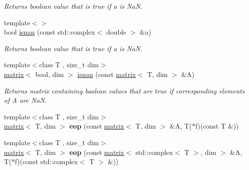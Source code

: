 \begin{DoxyCompactItemize}
\begin{DoxyCompactList}\small\item\em Returns boolean value that is true if a is Na\-N. \end{DoxyCompactList}\item 
\hypertarget{namespacekeycpp_ad06706aa6f44dde4b12566f81ed2be94}{{\footnotesize template$<$$>$ }\\bool \hyperlink{namespacekeycpp_ad06706aa6f44dde4b12566f81ed2be94}{isnan} (const std\-::complex$<$ double $>$ \&a)}\label{namespacekeycpp_ad06706aa6f44dde4b12566f81ed2be94}

\begin{DoxyCompactList}\small\item\em Returns boolean value that is true if a is Na\-N. \end{DoxyCompactList}\item 
\hypertarget{namespacekeycpp_a7e322f9a9b9a2bd3446ecaffbcea88cb}{{\footnotesize template$<$class T , size\-\_\-t dim$>$ }\\\hyperlink{classkeycpp_1_1matrix}{matrix}$<$ bool, dim $>$ \hyperlink{namespacekeycpp_a7e322f9a9b9a2bd3446ecaffbcea88cb}{isnan} (const \hyperlink{classkeycpp_1_1matrix}{matrix}$<$ T, dim $>$ \&A)}\label{namespacekeycpp_a7e322f9a9b9a2bd3446ecaffbcea88cb}

\begin{DoxyCompactList}\small\item\em Returns matrix containing boolean values that are true if corresponding elements of A are Na\-N. \end{DoxyCompactList}\item 
\hypertarget{namespacekeycpp_ac999bd518fb456aa9a4fbd2c04f007de}{{\footnotesize template$<$class T , size\-\_\-t dim$>$ }\\\hyperlink{classkeycpp_1_1matrix}{matrix}$<$ T, dim $>$ {\bfseries eop} (const \hyperlink{classkeycpp_1_1matrix}{matrix}$<$ T, dim $>$ \&A, T($\ast$f)(const T \&))}\label{namespacekeycpp_ac999bd518fb456aa9a4fbd2c04f007de}

\item 
\hypertarget{namespacekeycpp_a0865e2c884915d6ed0e3ef7bf73438b0}{{\footnotesize template$<$class T , size\-\_\-t dim$>$ }\\\hyperlink{classkeycpp_1_1matrix}{matrix}$<$ T, dim $>$ {\bfseries eop} (const \hyperlink{classkeycpp_1_1matrix}{matrix}$<$ std\-::complex$<$ T $>$, dim $>$ \&A, T($\ast$f)(const std\-::complex$<$ T $>$ \&))}\label{namespacekeycpp_a0865e2c884915d6ed0e3ef7bf73438b0}


\end{DoxyCompactItemize}

